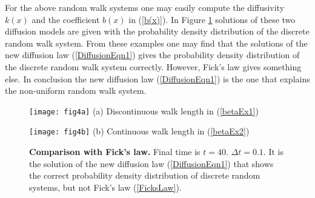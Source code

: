 \documentclass[11pt]{amsart}
\begin{document}
For the above random walk systems one may easily compute the diffusivity $k(x)$ and the coefficient $b(x)$ in (\ref{b(x)}). In Figure \ref{fig4} solutions of these two diffusion models are given with the probability density distribution of the discrete random walk system. From these examples one may find that the solutions of the new diffusion law (\ref{DiffusionEqn1}) gives the probability density distribution of the discrete random walk system correctly. However, Fick's law gives something else. In conclusion the new diffusion law (\ref{DiffusionEqn1}) is the one that explains the non-uniform random walk system.

\begin{figure}[ht]
\begin{minipage}[t]{0.49\textwidth}
 \centering
 \texttt{[image: fig4a]}
(a) Discontinuous walk length in (\ref{betaEx1})
\end{minipage}
\begin{minipage}[t]{0.49\textwidth}
\centering
 \texttt{[image: fig4b]}
(b) Continuous walk length in (\ref{betaEx2})
\end{minipage}
\caption{{\bf Comparison with Fick's law.} Final time is $t=40$. $\Delta t=0.1$. It is the solution of the new diffusion law (\ref{DiffusionEqn1}) that shows the correct probability density distribution of discrete random systems, but not Fick's law (\ref{FicksLaw}).} \label{fig4}
\end{figure}
\end{document}
